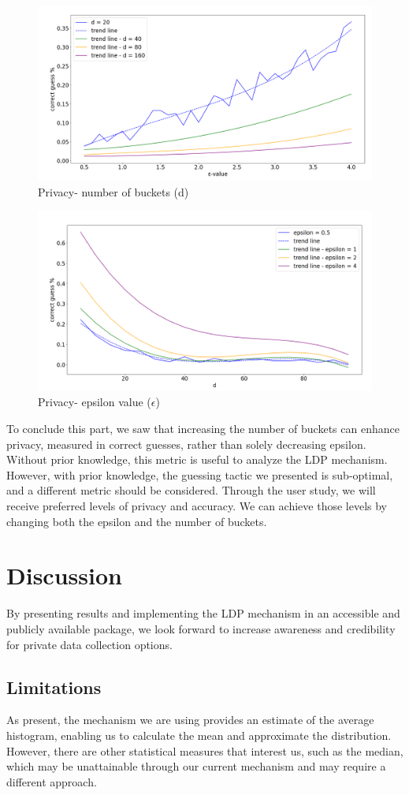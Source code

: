 \documentclass[sigconf]{acmart}
\begin{document}
\begin{figure}[h]
    \centering
    \includegraphics[width=.5\textwidth]{images/privacy- d.png}
    \caption{Privacy- number of buckets (d)}
    \label{fig:privacy-d}
\end{figure} 
\begin{figure}[h]
    \centering
    \includegraphics[width=.5\textwidth]{images/privacy- epsilon.png}
    \caption{Privacy- epsilon value ($\epsilon$)}
    \label{fig:privacy-epsilon}
\end{figure} 

To conclude this part, we saw that increasing the number of buckets can enhance privacy, measured in correct guesses, rather than solely decreasing epsilon. Without prior knowledge, this metric is useful to analyze the LDP mechanism. However, with prior knowledge, the guessing tactic we presented is sub-optimal, and a different metric should be considered. Through the user study, we will receive preferred levels of privacy and accuracy. We can achieve those levels by changing both the epsilon and the number of buckets.

\section{Discussion}

 By presenting results and implementing the LDP mechanism in an accessible and publicly available package, we look forward to increase awareness and credibility for private data collection options.

\subsection{Limitations} As present, the mechanism we are using provides an estimate of the average histogram, enabling us to calculate the mean and approximate the distribution. However, there are other statistical measures that interest us, such as the median, which may be unattainable through our current mechanism and may require a different approach.
\end{document}
